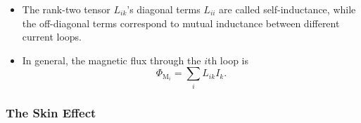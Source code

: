 \documentclass[11pt, a4paper]{article}
\begin{document}
\begin{itemize}
\begin{itemize}
        \item The rank-two tensor $ L_{ik} $'s diagonal terms $ L_{ii} $ are called self-inductance, while the off-diagonal terms correspond to mutual inductance between different current loops.

        \item In general, the magnetic flux through the $ i $th loop is
        \begin{equation*}
            \Phi_{\text{M}_{i}} = \sum_{i} L_{ik}I_{k}.
        \end{equation*}
    \end{itemize}
    
	
	

\end{itemize}

\subsubsection{The Skin Effect}
\end{document}
